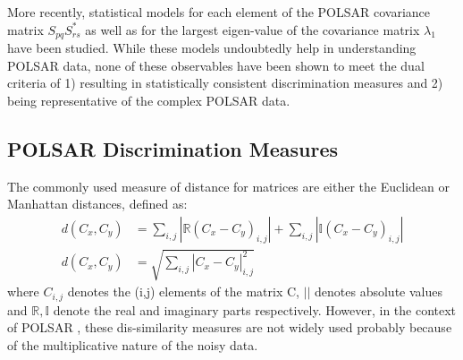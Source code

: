 \documentclass[journal]{IEEEtran}
\begin{document}
More recently, %
  statistical models for
  each element of the POLSAR covariance matrix $S_{pq}S_{rs}^*$ \cite{Lopez-Martinez_2003_TGRS_2232}
  as well as for the largest eigen-value of the covariance matrix $\lambda_1$ \cite{Erten_2012_Sensors_2766} have been studied.
While these models undoubtedly help in understanding POLSAR data,
  none of these observables have been shown to meet the dual criteria of
  1) resulting in statistically consistent discrimination measures and
  2) being representative of the complex POLSAR data.

\subsection{POLSAR Discrimination Measures}
\label{sec:lit_measures}


The commonly used measure of distance for matrices are either the Euclidean or Manhattan distances, defined as:
\begin{align}
  d(C_x,C_y) &= \sum_{i,j} |\mathbb{R} (C_x - C_y)_{i,j}| + \sum_{i,j} |\mathbb{I} (C_x - C_y)_{i,j}| \\
  d(C_x,C_y) &= \sqrt{\sum_{i,j} |C_x - C_y|_{i,j}^2 }
\end{align}
where $C_{i,j}$ denotes the (i,j) elements of the matrix C,
 $||$ denotes absolute values
and $\mathbb{R},\mathbb{I}$ denote the real and imaginary parts respectively.
However, in the context of POLSAR%
, these dis-similarity measures are not widely used 
  probably because of the multiplicative nature of the noisy data.
\end{document}

